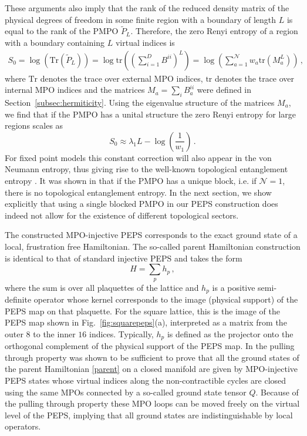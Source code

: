 \documentclass[12 pt]{article}
\begin{document}
These arguments also imply that the rank of the reduced density matrix of the physical degrees of freedom in some finite region with a boundary of length $L$ is equal to the rank of the PMPO $\tilde{P}_L$. Therefore, the zero Renyi entropy of a region with a boundary containing $L$ virtual indices is
\begin{equation}
    \begin{split}
        S_0 = \log(\text{Tr}(\tilde{P}_L)) = \log\text{tr}\left(\left(\sum_{i = 1}^D B^{ii}\right)^L\right) = \log\left(\sum_{a=1}^{\mathcal{N}}w_a\text{tr}\left( M_a^L\right)\right)\, ,
    \end{split}
\end{equation}
where $\text{Tr}$ denotes the trace over external MPO indices, $\text{tr}$ denotes the trace over internal MPO indices and the matrices $M_a=\sum_{i} B_a^{ii}$ were defined in Section~\ref{subsec:hermiticity}. Using the eigenvalue structure of the matrices $M_a$, we find that if the PMPO has a unital structure the zero Renyi entropy for large regions scales as
\begin{equation}
    S_0 \approx \lambda_1 L - \log\left(\frac{1}{w_1}\right)\, .
\end{equation}
For fixed point models this constant correction will also appear in the von Neumann entropy, thus giving rise to the well-known topological entanglement entropy \cite{KitaevPreskill}. It was shown in \cite{SPTpaper} that if the PMPO has a unique block, i.e. if $\mathcal{N} = 1$, there is no topological entanglement entropy. In the next section, we show explicitly that using a single blocked PMPO in our PEPS construction does indeed not allow for the existence of different topological sectors.

The constructed MPO-injective PEPS corresponds to the exact ground state of a local,  frustration free Hamiltonian. The so-called parent Hamiltonian construction is identical to that of standard injective PEPS \cite{GarciaVerstraeteWolfCirac08} and takes the form
\begin{equation}\label{parent}
    H = \sum_{p} h_p\, ,
\end{equation}
where the sum is over all plaquettes of the lattice and $h_p$ is a positive semi-definite operator whose kernel corresponds to the image (physical support) of the PEPS map on that plaquette. For the square lattice, this is the image of the PEPS map shown in Fig.~\ref{fig:squarepeps}(a), interpreted as a matrix from the outer $8$ to the inner $16$ indices. Typically, $h_p$ is defined as the projector onto the orthogonal complement of the physical support of the PEPS map. In \cite{MPOpaper} the pulling through property was shown to be sufficient to prove that all the ground states of the parent Hamiltonian \eqref{parent} on a closed manifold are given by MPO-injective PEPS states whose virtual indices along the non-contractible cycles are closed using the same MPOs connected by a so-called ground state tensor $Q$. Because of the pulling through property these MPO loops can be moved freely on the virtual level of the PEPS, implying that all ground states are indistinguishable by local operators.
\end{document}
